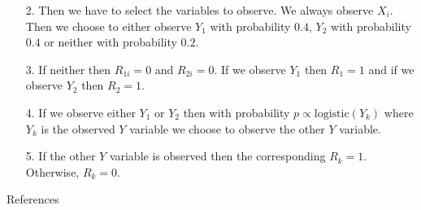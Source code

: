 \documentclass{beamer} %
\newcommand{\logistic}{{\text{logistic}}}
\begin{document}
\begin{frame}
  \begin{enumerate}
    \item[2.] Then we have to select the variables to observe. We always observe
        $X_i$. Then we choose to either observe $Y_1$ with probability $0.4$,
        $Y_2$ with probability $0.4$ or neither with probability $0.2$.

      \item[3.] If neither then $R_{1i} = 0$ and $R_{2i} = 0$. If we observe $Y_1$
        then $R_1 = 1$ and if we observe $Y_2$ then $R_2 = 1$.

      \item[4.] If we observe either $Y_1$ or $Y_2$ then with probability $p \propto
        \logistic(Y_k)$ where $Y_k$ is the observed $Y$ variable we choose to
        observe the other $Y$ variable.

      \item[5.] If the other $Y$ variable is observed then the corresponding $R_k =
        1$. Otherwise, $R_k = 0$.
      \end{enumerate}
    \end{frame}

\begin{frame}

    

\end{frame}

\begin{frame}

    

\end{frame}

\begin{frame}

    

\end{frame}

\begin{frame}[allowframebreaks]{References}
  \printbibliography
\end{frame}
\end{document}
